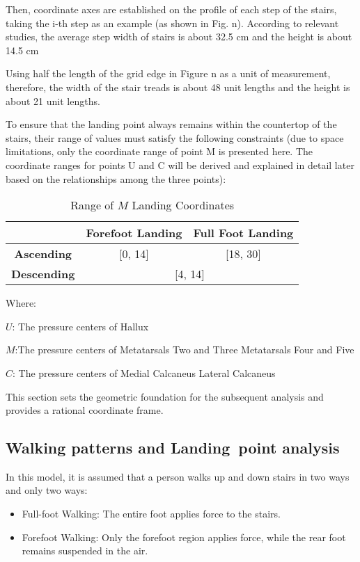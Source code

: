 \documentclass{mcmthesis}
\begin{document}
Then, coordinate axes are established on the profile of each step of the stairs, taking the i-th step as an example (as shown in Fig. n). According to relevant studies, the average step width of stairs is about 32.5 cm and the height is about 14.5 cm \cite{WOS:000783553300001}

Using half the length of the grid edge in Figure n as a unit of measurement, therefore, the width of the stair treads is about 48 unit lengths and the height is about 21 unit lengths.

To ensure that the landing point always remains within the countertop of the stairs, their range of values must satisfy the following constraints (due to space limitations, only the coordinate range of point M is presented here. The coordinate ranges for points U and C will be derived and explained in detail later based on the relationships among the three points):

\begin{table}[h!]
  \centering
  \caption{Range of \(M\) Landing Coordinates}
  \begin{tabular}{@{}c cc@{}}
  \toprule
  \textbf{}      & \textbf{Forefoot Landing} & \textbf{Full Foot Landing} \\ \midrule
  \textbf{Ascending} & [0, 14]                  & [18, 30]                   \\ 
  \textbf{Descending} & \multicolumn{2}{c}{[4, 14]}                            \\ \bottomrule
  \end{tabular}
  \end{table}

Where:

\(U\): The pressure centers of Hallux  

\(M\):The pressure centers of Metatarsals Two and Three Metatarsals Four and Five

\(C\): The pressure centers of Medial Calcaneus Lateral Calcaneus 

This section sets the geometric foundation for the subsequent analysis and provides a rational coordinate frame.


\subsection{Walking patterns and Landing point analysis}

In this model, it is assumed that a person walks up and down stairs in two ways and only two ways:

\begin{itemize}
  \item Full-foot Walking: The entire foot applies force to the stairs.

  \item Forefoot Walking: Only the forefoot region applies force, while the rear foot remains suspended in the air.
\end{itemize}
\end{document}

